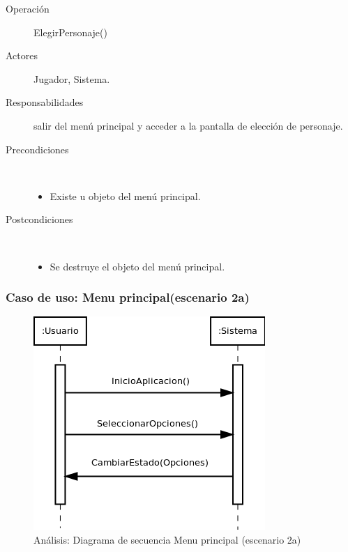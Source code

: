 \begin{description}
    \item [Operación] ElegirPersonaje()
    \item [Actores] Jugador, Sistema.
    \item [Responsabilidades] salir del menú principal y acceder a la pantalla de elección de personaje.
    \item [Precondiciones] $\quad$
        \begin{itemize}
            \item Existe u objeto del menú principal.
        \end{itemize}
    \item [Postcondiciones] $\quad$
        \begin{itemize}
            \item Se destruye el objeto del menú principal.
        \end{itemize}
\end{description}

\subsubsection{Caso de uso: Menu principal(escenario 2a)}

\begin{figure}[H]
  \label{secuencia_menu_principal2}
  \begin{center}
    \includegraphics[scale=0.6]{imagenes/analisis/secuencia_menu_principal2.png}
  \end{center}
  \caption{Análisis: Diagrama de secuencia Menu principal (escenario 2a)}
\end{figure}

